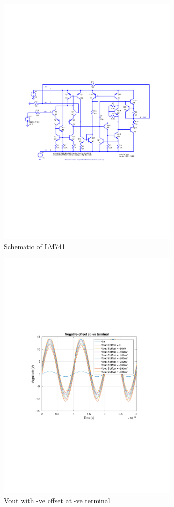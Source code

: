 \documentclass[12pt,a4paper,UKenglish]{article}
\begin{document}
\begin{figure} [H]
  \centering 
  \includegraphics[width=0.8\textwidth]{img/sch_1a.pdf} 
  \caption{Schematic of LM741}
  \label{sch_lm} 
\end{figure}

\begin{figure} [H]
  \centering 
  \includegraphics[width=0.8\textwidth]{img/1a_offset_neg.pdf} 
  \caption{Vout with -ve offset at -ve terminal}
  \label{neg_offset} 
\end{figure}
\end{document}
